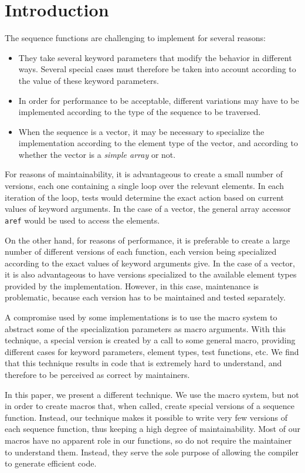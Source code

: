 \section{Introduction}

The \commonlisp{} \cite{ansi:common:lisp} sequence functions are
challenging to implement for several reasons:

\begin{itemize}
\item They take several keyword parameters that modify the behavior in
  different ways.  Several special cases must therefore be taken into
  account according to the value of these keyword parameters.
\item In order for performance to be acceptable, different variations
  may have to be implemented according to the type of the sequence to
  be traversed.
\item When the sequence is a vector, it may be necessary to specialize
  the implementation according to the element type of the vector, and
  according to whether the vector is a \emph{simple array} or not.
\end{itemize}

For reasons of maintainability, it is advantageous to create a small
number of versions, each one containing a single loop over the
relevant elements.  In each iteration of the loop, tests would
determine the exact action based on current values of keyword
arguments.  In the case of a vector, the general array accessor
\texttt{aref} would be used to access the elements.

On the other hand, for reasons of performance, it is preferable to
create a large number of different versions of each function, each
version being specialized according to the exact values of keyword
arguments give.  In the case of a vector, it is also advantageous to
have versions specialized to the available element types provided by
the implementation.  However, in this case, maintenance is
problematic, because each version has to be maintained and tested
separately.

A compromise used by some implementations is to use the \commonlisp{}
macro system to abstract some of the specialization parameters as
macro arguments.  With this technique, a special version is created by
a call to some general macro, providing different cases for keyword
parameters, element types, test functions, etc.  We find that this
technique results in code that is extremely hard to understand, and
therefore to be perceived as correct by maintainers.

In this paper, we present a different technique.  We use the
\commonlisp{} macro system, but not in order to create macros that,
when called, create special versions of a sequence function.  Instead,
our technique makes it possible to write very few versions of each
sequence function, thus keeping a high degree of maintainability.
Most of our macros have no apparent role in our functions, so do not
require the maintainer to understand them.  Instead, they serve the
sole purpose of allowing the compiler to generate efficient code.
